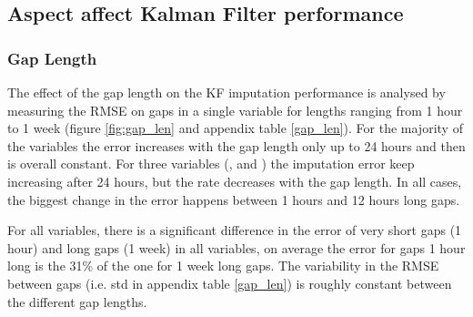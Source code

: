 \documentclass{article}
\let\Oldsubsection\subsection
\renewcommand{\subsection}{\FloatBarrier\Oldsubsection}
\begin{document}



\subsection{Aspect affect Kalman Filter performance}

\subsubsection{Gap Length}

The effect of the gap length on the KF imputation performance is analysed by measuring the RMSE on gaps in a single variable for lengths ranging from 1 hour to 1 week (figure \ref{fig:gap_len} and appendix table \ref{gap_len}). For the majority of the variables the error increases with the gap length only up to 24 hours and then is overall constant. For three variables (,  and ) the imputation error keep increasing after 24 hours, but the rate decreases with the gap length. In all cases, the biggest change in the error happens between 1 hours and 12 hours long gaps.

For all variables, there is a significant difference in the error of very short gaps (1 hour) and long gaps (1 week) in all variables, on average the error for gaps 1 hour long is the 31\% of the one for 1 week long gaps.
The variability in the RMSE between gaps (i.e. std in appendix table \ref{gap_len}) is roughly constant between the different gap lengths.

\end{document}
